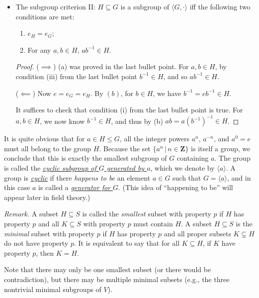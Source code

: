 \documentclass[11pt]{article}
\newcommand{\rmk}{\noindent\textit{Remark. }}
\newcommand{\where}{\,|\,}
\newcommand{\Z}{\mathbf{Z}}
\newcommand{\df}[1]{\ul{\textit{\textsf{#1}}}}
\newcommand{\la}{\langle}
\newcommand{\ra}{\rangle}
\begin{document}
\begin{itemize}
\begin{proof}
        ($\impliedby$) Remember associativity is inherited.
    \end{proof}
    \item The subgroup criterion II: $H \subseteq G$ is a subgroup of $\la G,\cdot \ra$ iff the following two conditions are met:
    \begin{enumerate}[label=(\alph*)]
        \item $e_H = e_G$;
        \item For any $a,b \in H$, $ab^{-1} \in H$.
    \end{enumerate}
    \begin{proof}
        ($\implies$) (a) was proved in the last bullet point. For $a,b \in H$, by condition (iii) from the last bullet point $b^{-1} \in H$, and so $ab^{-1} \in H$.

        ($\impliedby$) Now $e = e_G = e_H$. By $(b)$, for $b \in H$, we have $b^{-1} = eb^{-1} \in H$.
        
        It suffices to check that condition (i) from the last bullet point is true. For $a,b \in H$, we now know $b^{-1} \in H$, and thus by (b) $ab = a(b^{-1})^{-1} \in H$.
    \end{proof}
\end{itemize}
\begin{framed}
    It is quite obvious that for $a \in H \leq G$, all the integer powers $a^n$, $a^{-n}$, and $a^0 = e$ must all belong to the group $H$. Because the set $\{a^n \where n \in \Z\}$ is itself a group, we conclude that this is exactly the smallest subgroup of $G$ containing $a$. The group is called the \df{cyclic subgroup of $G$ generated by $a$}, which we denote by $\la a \ra$. A group is \df{cyclic} if there \emph{happens to be} an element $a \in G$ such that $G = \la a \ra$, and in this case $a$ is called a \df{generator for $G$}. (This idea of ``happening to be'' will appear later in field theory.)
\end{framed}
\rmk A subset $H \subseteq S$ is called the \emph{smallest} subset with property $p$ if $H$ has property $p$ and all $K \subseteq S$ with property $p$ must contain $H$. A subset $H \subseteq S$ is the \emph{minimal} subset with property $p$ if $H$ has property $p$ and all proper subsets $K \subsetneq H$ do not have property $p$. It is equivalent to say that for all $K \subseteq H$, if $K$ have property $p$, then $K = H$.

Note that there may only be one smallest subset (or there would be contradiction), but there may be multiple minimal subsets (e.g., the three nontrivial minimal subgroups of $V$).
\end{document}
